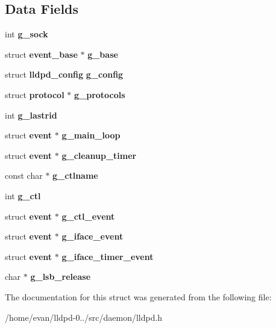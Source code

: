 \subsection*{\-Data \-Fields}
\begin{DoxyCompactItemize}
\item 
int {\bfseries g\-\_\-sock}\label{structlldpd_afddfc96af33750c0694c91def4c0bd8f}

\item 
struct {\bf event\-\_\-base} $\ast$ {\bfseries g\-\_\-base}\label{structlldpd_ad4d1ef0fd933ab3157bafc4a18626f30}

\item 
struct {\bf lldpd\-\_\-config} {\bfseries g\-\_\-config}\label{structlldpd_a43245656af826681c120fafec4ab8108}

\item 
struct {\bf protocol} $\ast$ {\bfseries g\-\_\-protocols}\label{structlldpd_a0bcbdd76612573e7f45ded79f17140dc}

\item 
int {\bfseries g\-\_\-lastrid}\label{structlldpd_a9fe09b30fcccd55bd52fe772463d14e0}

\item 
struct {\bf event} $\ast$ {\bfseries g\-\_\-main\-\_\-loop}\label{structlldpd_afedf231e57eb1830517946238fcf0411}

\item 
struct {\bf event} $\ast$ {\bfseries g\-\_\-cleanup\-\_\-timer}\label{structlldpd_ab07dd738441b04223f5120b632f67ee1}

\item 
const char $\ast$ {\bfseries g\-\_\-ctlname}\label{structlldpd_a81f9396b83ba207b6f64c4357945ed7b}

\item 
int {\bfseries g\-\_\-ctl}\label{structlldpd_a55bb4c1f4e7fe2873a67617f738ab698}

\item 
struct {\bf event} $\ast$ {\bfseries g\-\_\-ctl\-\_\-event}\label{structlldpd_a5fbbef113442e33e7023ceb4c76afc72}

\item 
struct {\bf event} $\ast$ {\bfseries g\-\_\-iface\-\_\-event}\label{structlldpd_a76adc07c9282bf89290d1bfdfeb4f874}

\item 
struct {\bf event} $\ast$ {\bfseries g\-\_\-iface\-\_\-timer\-\_\-event}\label{structlldpd_ab4880356c7ac0c7b1eb264f0714163ee}

\item 
char $\ast$ {\bfseries g\-\_\-lsb\-\_\-release}\label{structlldpd_a79a3540efa5b9fc6de263e1f26d9ba4b}

\end{DoxyCompactItemize}


\-The documentation for this struct was generated from the following file\-:\begin{DoxyCompactItemize}
\item 
/home/evan/lldpd-\/0../src/daemon/lldpd.\-h\end{DoxyCompactItemize}
